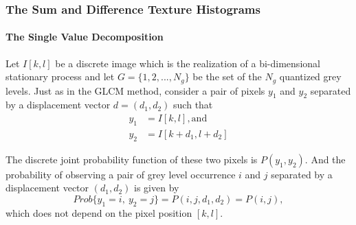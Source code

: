 


\subsubsection{The Sum and Difference Texture Histograms}
\label{sec:sum_and_diff_hist_texture}
\paragraph{The Single Value Decomposition}
Let $I[k,l]$ be a discrete image which is the realization of a bi-dimensional stationary process and let $G=\{1, 2,...,N_g\}$ be the set of the $N_g$ quantized grey levels.
Just as in the GLCM method, consider a pair of pixels $y_1$ and $y_2$ separated by a displacement vector $d = (d_1, d_2)$ such that
\begin{equation}
\begin{split}
    y_1 &= I[k,l], \text{and}\\
    y_2 &= I[k+d_1, l+d_2]
\end{split}
\end{equation}

The discrete joint probability function of these two pixels is $P(y_1, y_2)$. And the probability of observing a pair of grey level occurrence $i$ and $j$ separated by a displacement vector $(d_1, d_2)$ is given by
\begin{equation}
    Prob\{y_1=i,\  y_2=j\} = P(i,j,d_1,d_2) = P(i,j),
\end{equation}
which does not depend on the pixel position $[k,l]$.

